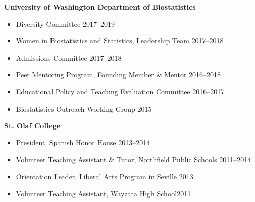 \documentclass[margin]{res}
\begin{document}
\begin{resume}
\textbf{University of Washington Department of Biostatistics}
\begin{itemize} %
	
	\item Diversity Committee \hfill 2017--2019
	
	\item Women in Biostatistics and Statistics, Leadership Team \hfill 2017--2018
	
	\item Admissions Committee \hfill 2017--2018
	
	\item Peer Mentoring Program, Founding Member \& Mentor \hfill 2016--2018
	
	\item Educational Policy and Teaching Evaluation Committee \hfill 2016--2017
	
	\item Biostatistics Outreach Working Group \hfill 2015%
\end{itemize}



\textbf{St. Olaf College}
\begin{itemize}
			
			\item President, Spanish Honor House \hfill 2013--2014
			
			\item Volunteer Teaching Assistant \& Tutor, Northfield Public Schools \hfill 2011--2014
			
			
			
			\item Orientation Leader, Liberal Arts Program in Seville \hfill 2013 
			
			
			
			\item Volunteer Teaching Assistant, Wayzata High School\hfill 2011 \\
\end{itemize}





\end{resume}
\end{document}
